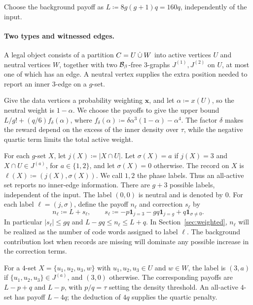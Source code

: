 \documentclass[10pt]{article}
\numberwithin{equation}{section}
\theoremstyle{definition}
\newcommand{\x}{\boldsymbol{x}}\newcommand{\y}{\boldsymbol{y}}
\begin{document}
Choose the background payoff as $L\coloneqq8g(g+1)q=160q$, independently of the input.
\paragraph{Two types and witnessed edges.}
A legal object consists of a partition $C=U\mathbin{\dot\cup} W$ into active vertices $U$ and neutral vertices $W$, together with two $\mathcal B_\beta$-free $3$-graphs $J^{(1)},J^{(2)}$ on $U$, at most one of which has an edge. A neutral vertex supplies the extra position needed to report an inner $3$-edge on a $g$-set.

Give the data vertices a probability weighting $\x$, and let $\alpha\coloneqq x(U)$, so the neutral weight is $1-\alpha$. We choose the payoffs to give the upper bound $L/g!+(q/6)f_\delta(\alpha)$, where $f_\delta(\alpha)\coloneqq\delta\alpha^3(1-\alpha)-\alpha^4$. The factor $\delta$ makes the reward depend on the excess of the inner density over $\tau$, while the negative quartic term limits the total active weight.

For each $g$-set $X$, let $j(X)\coloneqq|X\cap U|$. Let $\sigma(X)=a$ if $j(X)=3$ and $X\cap U\in J^{(a)}$, for $a\in\{1,2\}$, and let $\sigma(X)=0$ otherwise. The record on $X$ is $\ell(X)\coloneqq(j(X),\sigma(X))$. We call $1,2$ the phase labels. Thus an all-active set reports no inner-edge information. There are $g+3$ possible labels, independent of the input. The label $(0,0)$ is neutral and is denoted by $0$. For each label $\ell=(j,\sigma)$, define the payoff $n_\ell$ and correction $s_\ell$ by
\begin{equation}\label{eq:payoff}
 n_\ell\coloneqq L+s_\ell,\qquad
 s_\ell\coloneqq-p\mathbf1_{j=3}-gq\mathbf1_{j=g}
                       +q\mathbf1_{\sigma\ne0}.
\end{equation}
In particular $|s_\ell|\le gq$ and $L-gq\le n_\ell\le L+q$. In Section~\ref{sec:weighted}, $n_\ell$ will be realized as the number of code words assigned to label $\ell$. The background contribution lost when records are missing will dominate any possible increase in the correction terms.

For a $4$-set $X=\{u_1,u_2,u_3,w\}$ with $u_1,u_2,u_3\in U$ and $w\in W$, the label is $(3,a)$ if $\{u_1,u_2,u_3\}\in J^{(a)}$, and $(3,0)$ otherwise. The corresponding payoffs are $L-p+q$ and $L-p$, with $p/q=\tau$ setting the density threshold. An all-active $4$-set has payoff $L-4q$; the deduction of $4q$ supplies the quartic penalty.
\end{document}
